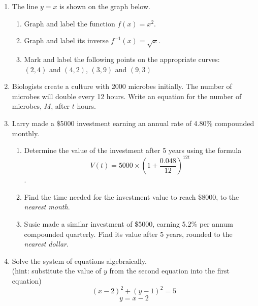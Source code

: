 \documentclass[12pt, twoside]{article}
\begin{document}
\begin{enumerate}
\newpage
\item The line $y=x$ is shown on the graph below.
    \begin{enumerate}
        \item Graph and label the function $f(x)=x^2$.
        \item Graph and label its inverse $f^{-1}(x)=\sqrt{x}$.
        \item Mark and label the following points on the appropriate curves:\\
        $(2,4)$ and $(4,2)$, $(3,9)$ and $(9,3)$
    \end{enumerate}
    \begin{center}
        \end{center}

\newpage

\item Biologists create a culture with 2000 microbes initially. The number of microbes will double every 12 hours. Write an equation for the
number of microbes, $M$, after $t$ hours.
\vspace{2cm}

\item Larry made a \$5000 investment earning an annual rate of 4.80\% compounded monthly.
    \begin{enumerate}
    \item Determine the value of the investment after 5 years using the formula 
        $$\displaystyle V(t)=5000 \times (1+\frac{0.048}{12})^{12t}$$. \vspace{4cm}
    \item Find the time needed for the investment value to reach \$8000, to the \emph{nearest month}. \vspace{4cm}
    \item Susie made a similar investment of \$5000, earning 5.2\% per annum compounded quarterly. Find its value after 5 years, rounded to the \emph{nearest dollar}.
    \end{enumerate}

\newpage
\item Solve the system of equations algebraically. \\[0.25cm] 
    (hint: substitute the value of $y$ from the second equation into the first equation)
    $$\left(x-2\right)^{2}+\left(y-1\right)^{2}=5$$
    $$y=x-2$$

    
\end{enumerate}
\end{document}
